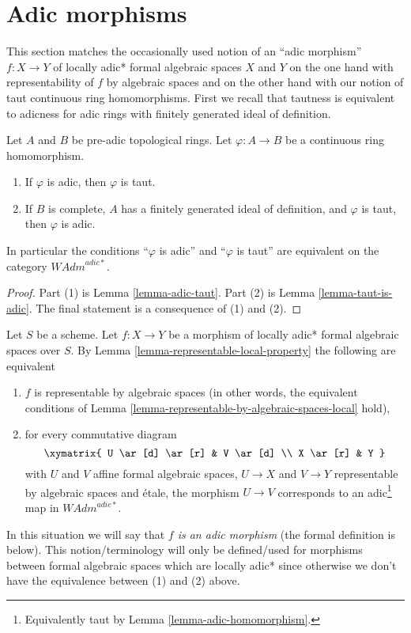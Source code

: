 \section{Adic morphisms}
\label{section-adic}

\noindent
This section matches the occasionally used notion of an
``adic morphism'' $f : X \to Y$ of locally adic* formal algebraic spaces
$X$ and $Y$ on the one hand with representability of $f$ by
algebraic spaces and on the other hand with our notion of
taut continuous ring homomorphisms. First we recall that
tautness is equivalent to adicness for adic rings with finitely
generated ideal of definition.

\begin{lemma}
\label{lemma-adic-homomorphism}
Let $A$ and $B$ be pre-adic topological rings. Let
$\varphi : A \to B$ be a continuous ring homomorphism.
\begin{enumerate}
\item If $\varphi$ is adic, then $\varphi$ is taut.
\item If $B$ is complete, $A$ has a finitely generated
ideal of definition, and $\varphi$ is taut, then $\varphi$ is adic.
\end{enumerate}
In particular the conditions ``$\varphi$ is adic'' and ``$\varphi$ is taut''
are equivalent on the category $\textit{WAdm}^{adic*}$.
\end{lemma}

\begin{proof}
Part (1) is Lemma \ref{lemma-adic-taut}.
Part (2) is Lemma \ref{lemma-taut-is-adic}.
The final statement is a consequence of (1) and (2).
\end{proof}

\noindent
Let $S$ be a scheme. Let $f : X \to Y$ be a morphism of
locally adic* formal algebraic spaces over $S$.
By Lemma \ref{lemma-representable-local-property}
the following are equivalent
\begin{enumerate}
\item $f$ is representable by algebraic spaces (in other words, the
equivalent conditions of
Lemma \ref{lemma-representable-by-algebraic-spaces-local} hold),
\item for every commutative diagram
$$
\xymatrix{
U \ar[d] \ar[r] & V \ar[d] \\
X \ar[r] & Y
}
$$
with $U$ and $V$ affine formal algebraic spaces, $U \to X$ and $V \to Y$
representable by algebraic spaces and \'etale, the morphism $U \to V$
corresponds to an adic\footnote{Equivalently taut by
Lemma \ref{lemma-adic-homomorphism}.} map in $\textit{WAdm}^{adic*}$.
\end{enumerate}
In this situation we will say that {\it $f$ is an adic morphism} (the formal
definition is below). This notion/terminology will only be defined/used
for morphisms between formal algebraic spaces which are locally adic*
since otherwise we don't have the equivalence between (1) and (2) above.


